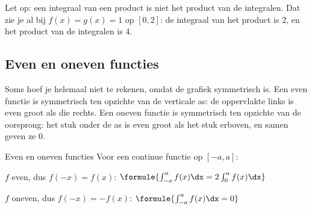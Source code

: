 Let op: een integraal van een product is niet het product van de integralen. Dat zie je al bij $f(x) = g(x) = 1$ op $[0, 2]$: de integraal van het product is 2, en het product van de integralen is 4.


\begin{oefeningen}
\end{oefeningen}

\subsection{Even en oneven functies}

Soms hoef je helemaal niet te rekenen, omdat de grafiek symmetrisch is. Een even functie is symmetrisch ten opzichte van de verticale as: de oppervlakte links is even groot als die rechts. Een oneven functie is symmetrisch ten opzichte van de oorsprong: het stuk onder de as is even groot als het stuk erboven, en samen geven ze 0.



\begin{theorie}
\begin{stelling}{Even en oneven functies}
Voor een continue functie op $[-a, a]$:

\vspace{1mm}
$f$ even, dus $f(-x) = f(x)$: \quad $\formule{\int_{-a}^{a} f(x)\dx = 2\int_0^a f(x)\dx}$

\vspace{1.5mm}
$f$ oneven, dus $f(-x) = -f(x)$: \quad $\formule{\int_{-a}^{a} f(x)\dx = 0}$
\end{stelling}
\end{theorie}

